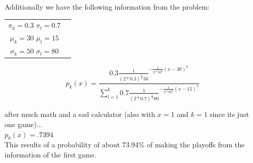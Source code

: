 \documentclass[12pt]{article}
\newcommand\tab[1][1cm]{\hspace*{#1}}
\begin{document}
Additionally we have the following information from the problem:\\
\begin{center}
    \begin{tabular}{c c}
        $\pi_k = 0.3$       \tab$\pi_l = 0.7$   \\
        $\mu_k = 30$        \tab$\mu_l = 15$    \\
        $\sigma_k = 50$     \tab$\sigma_l = 80$ \\
    \end{tabular}
\end{center}

\[
    p_k(x)=\frac{0.3\frac{1}{(2*0.3)^{\frac{1}{2}}50}^{-\frac{1}{2*50^2}(x-30)^2}}{\sum^k_{l=1}0.7\frac{1}{(2*0.7)^{\frac{1}{2}}80}^{-\frac{1}{2*80^2}(x-15)^2}}
\]
\begin{center}
    after much math and a sad calculator (also with $x = 1$ and $k = 1$ since its just one game)...\\
    $p_k(x) = .7394$\\
    This results of a probability of about 73.94\% of making the playoffs from the information of the first game.
\end{center}
\end{document}
